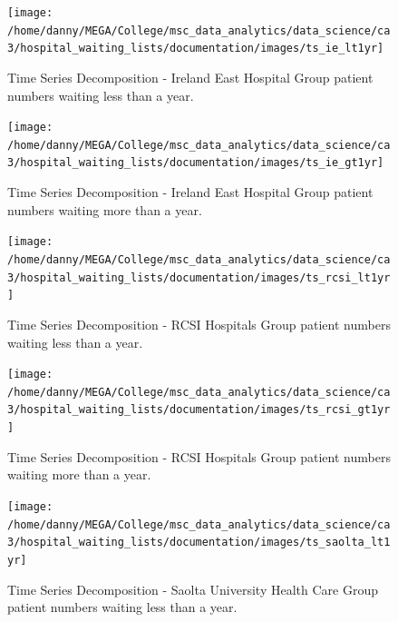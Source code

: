 \documentclass[
  12pt,
]{article}
\begin{document}
\begin{figure}

{\centering \texttt{[image: /home/danny/MEGA/College/msc\_data\_analytics/data\_science/ca3/hospital\_waiting\_lists/documentation/images/ts\_ie\_lt1yr]} 

}

\caption{Time Series Decomposition - Ireland East Hospital Group patient numbers waiting less than a year.}\label{fig:ts-ie-lt1yr}
\end{figure}

\begin{figure}

{\centering \texttt{[image: /home/danny/MEGA/College/msc\_data\_analytics/data\_science/ca3/hospital\_waiting\_lists/documentation/images/ts\_ie\_gt1yr]} 

}

\caption{Time Series Decomposition - Ireland East Hospital Group patient numbers waiting more than a year.}\label{fig:ts-ie-gt1yr}
\end{figure}

\begin{figure}

{\centering \texttt{[image: /home/danny/MEGA/College/msc\_data\_analytics/data\_science/ca3/hospital\_waiting\_lists/documentation/images/ts\_rcsi\_lt1yr]} 

}

\caption{Time Series Decomposition - RCSI Hospitals Group patient numbers waiting less than a year.}\label{fig:ts-rcsi-lt1yr}
\end{figure}

\begin{figure}

{\centering \texttt{[image: /home/danny/MEGA/College/msc\_data\_analytics/data\_science/ca3/hospital\_waiting\_lists/documentation/images/ts\_rcsi\_gt1yr]} 

}

\caption{Time Series Decomposition - RCSI Hospitals Group patient numbers waiting more than a year.}\label{fig:ts-rcsi-gt1yr}
\end{figure}

\begin{figure}

{\centering \texttt{[image: /home/danny/MEGA/College/msc\_data\_analytics/data\_science/ca3/hospital\_waiting\_lists/documentation/images/ts\_saolta\_lt1yr]} 

}

\caption{Time Series Decomposition - Saolta University Health Care Group patient numbers waiting less than a year.}\label{fig:ts-saolta-lt1yr}
\end{figure}
\end{document}

